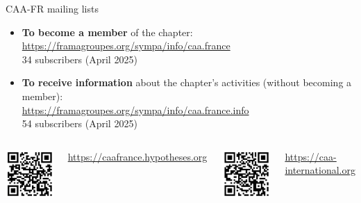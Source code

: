 \documentclass[xcolor=dvipsnames, 10pt, french, american]{beamer}
\begin{document}
 
\begin{frame}
	\begin{block}{CAA-FR mailing lists}
		\begin{itemize}
			\item \textbf{To become a member} of the chapter: \\
                \url{https://framagroupes.org/sympa/info/caa.france}\\
                 34 subscribers (April 2025)
			\item \textbf{To receive information} about the chapter's activities (without becoming a member):\\ 
                \url{https://framagroupes.org/sympa/info/caa.france.info}\\
                  54 subscribers (April 2025)
		\end{itemize}
	\end{block}\medskip
    
     \begin{columns}[t]
            \centering
            \includegraphics[height=0.2\textheight]{figures/CAA-Fr_QR-Code-05}\hfill
            
            \footnotesize\url{https://caafrance.hypotheses.org}
    	
            \centering
            \includegraphics[height=0.2\textheight]{figures/CAA-Int_QR-Code-04}
            
            \footnotesize\url{https://caa-international.org}
    \end{columns}
\end{frame}
\end{document}
